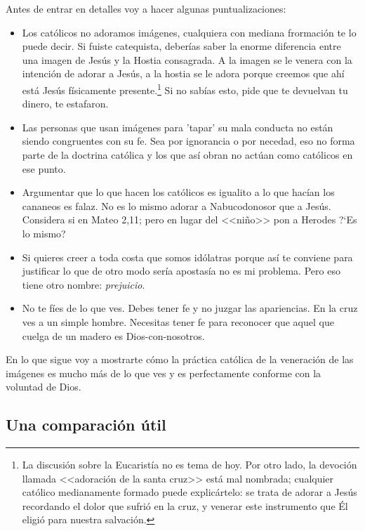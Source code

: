 \documentclass{article}
\begin{document}
\noindent
Antes de entrar en detalles voy a hacer algunas puntualizaciones:

\begin{itemize}
\item Los cat\'olicos no adoramos im\'agenes, cualquiera con mediana frormaci\'on te lo puede decir. Si fuiste catequista, deber\'{i}as saber la enorme diferencia entre una imagen de Jes\'us y la Hostia consagrada. A la imagen se le venera con la intenci\'on de adorar a Jes\'us, a la hostia se le adora porque creemos que ah\'{i} est\'a Jes\'us f\'{i}sicamente presente.\footnote{La discusi\'on sobre la Eucarist\'{i}a no es tema de hoy. Por otro lado, la devoci\'on llamada <<adoraci\'on de la santa cruz>> est\'a mal nombrada; cualquier cat\'olico medianamente formado puede explic\'artelo: se trata de adorar a Jes\'us recordando el dolor que sufri\'o en la cruz, y venerar este instrumento que \'El eligi\'o para nuestra salvaci\'on.} Si no sab\'{i}as esto, pide que te devuelvan tu dinero, te estafaron.

\item Las personas que usan im\'agenes para 'tapar' su mala conducta no est\'an siendo congruentes con su fe. Sea por ignorancia o por necedad, eso no forma parte de la doctrina cat\'olica y los que as\'{i} obran no act\'uan como cat\'olicos en ese punto.

\item Argumentar que lo que hacen los cat\'olicos es igualito a lo que hac\'{i}an los cananeos es falaz. No es lo mismo adorar a Nabucodonosor que a Jes\'us. Considera si en Mateo 2,11; pero en lugar del <<ni\~no>> pon a Herodes ?`Es lo mismo?

\item Si quieres creer a toda costa que somos id\'olatras porque as\'{i} te conviene para justificar lo que de otro modo ser\'{i}a apostas\'{i}a no es mi problema. Pero eso tiene otro nombre: \emph{prejuicio}.

\item No te f\'{i}es de lo que ves. Debes tener fe y no juzgar las apariencias. En la cruz ves a un simple hombre. Necesitas tener fe para reconocer que aquel que cuelga de un madero es Dios-con-nosotros.
\end{itemize}

\noindent
En lo que sigue voy a mostrarte c\'omo la pr\'actica cat\'olica de la veneraci\'on de las im\'agenes es mucho m\'as de lo que ves y es perfectamente conforme con la voluntad de Dios.

\subsection{Una comparaci\'on \'util}
\end{document}
